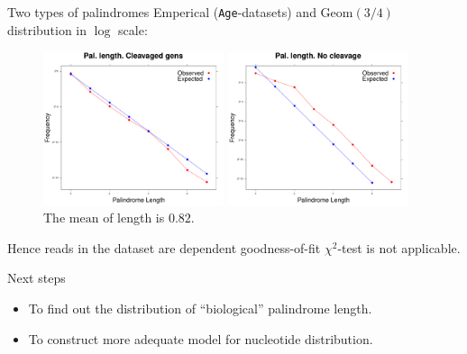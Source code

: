 \documentclass{beamer}\usepackage[]{graphicx}\usepackage[]{color}
\begin{document}
\begin{frame}{Two types of palindromes}
  Emperical (\texttt{Age}-datasets) and $\mathrm{Geom}(3/4)$ distribution in $\log$ scale:
 \begin{figure}[h]
  \begin{minipage}[h]{0.49\linewidth}
    \center\includegraphics[width=150pt]{distr_pal_len_cl.pdf}
    \caption{\footnotesize{The $\mathrm{mean}$  of length is $0.33$.}}
  \end{minipage}
  \hfill
  \begin{minipage}[h]{0.49\linewidth}
   \includegraphics[width=150pt]{distr_pal_len_nocl.pdf}
   \caption{\footnotesize{The $\mathrm{mean}$ of length is $0.82$.}} 
  \end{minipage}
 \end{figure}
 
 \pause
 {\color{blue} Hence reads in the dataset are dependent goodness-of-fit $\chi^2$-test is not applicable. }
\end{frame}


\begin{frame}{Next steps}
  \begin{itemize}
    \item To find out the distribution of ``biological'' palindrome length.
    \item To construct more adequate model for nucleotide distribution.
  \end{itemize}
\end{frame}
\end{document}
